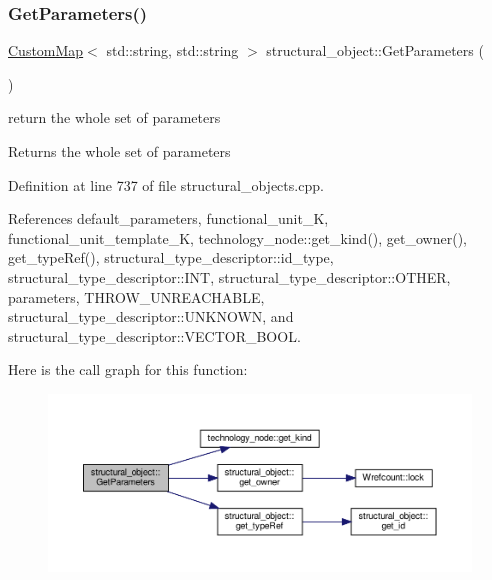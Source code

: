 \subsubsection{\texorpdfstring{Get\+Parameters()}{GetParameters()}}
{\footnotesize\ttfamily \hyperlink{custom__map_8hpp_a18ca01763abbe3e5623223bfe5aaac6b}{Custom\+Map}$<$ std\+::string, std\+::string $>$ structural\+\_\+object\+::\+Get\+Parameters (\begin{DoxyParamCaption}{ }\end{DoxyParamCaption})}



return the whole set of parameters 

\begin{DoxyReturn}{Returns}
the whole set of parameters 
\end{DoxyReturn}


Definition at line 737 of file structural\+\_\+objects.\+cpp.



References default\+\_\+parameters, functional\+\_\+unit\+\_\+K, functional\+\_\+unit\+\_\+template\+\_\+K, technology\+\_\+node\+::get\+\_\+kind(), get\+\_\+owner(), get\+\_\+type\+Ref(), structural\+\_\+type\+\_\+descriptor\+::id\+\_\+type, structural\+\_\+type\+\_\+descriptor\+::\+I\+NT, structural\+\_\+type\+\_\+descriptor\+::\+O\+T\+H\+ER, parameters, T\+H\+R\+O\+W\+\_\+\+U\+N\+R\+E\+A\+C\+H\+A\+B\+LE, structural\+\_\+type\+\_\+descriptor\+::\+U\+N\+K\+N\+O\+WN, and structural\+\_\+type\+\_\+descriptor\+::\+V\+E\+C\+T\+O\+R\+\_\+\+B\+O\+OL.

Here is the call graph for this function\+:
\nopagebreak
\begin{figure}[H]
\begin{center}
\leavevmode
\includegraphics[width=350pt]{d8/da3/classstructural__object_a3319b409440f03f4e953b7c48f9aea25_cgraph}
\end{center}
\end{figure}
\mbox{\label{classstructural__object_a6770e169cf00f814a35b2939ec8f92eb}} 
